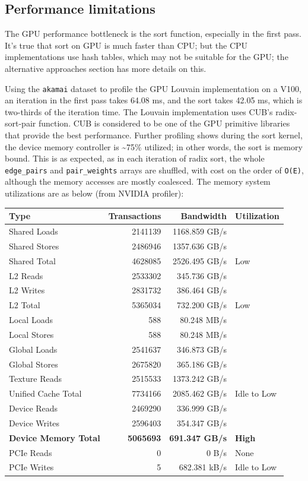 \documentclass[10pt,oneside]{memoir}
\begin{document}
\hypertarget{performance-limitations-4}{%
\subsection{Performance limitations}\label{performance-limitations-4}}

The GPU performance bottleneck is the sort function, especially in the
first pass. It's true that sort on GPU is much faster than CPU; but the
CPU implementations use hash tables, which may not be suitable for the
GPU; the alternative approaches section has more details on this.

Using the \texttt{akamai} dataset to profile the GPU Louvain
implementation on a V100, an iteration in the first pass takes 64.08 ms,
and the sort takes 42.05 ms, which is two-thirds of the iteration time.
The Louvain implementation uses CUB's radix-sort-pair function. CUB is
considered to be one of the GPU primitive libraries that provide the
best performance. Further profiling shows during the sort kernel, the
device memory controller is \textasciitilde{}75\% utilized; in other
words, the sort is memory bound. This is as expected, as in each
iteration of radix sort, the whole \texttt{edge\_pairs} and
\texttt{pair\_weights} arrays are shuffled, with cost on the order of
\texttt{O(\textbar{}E\textbar{})}, although the memory accesses are
mostly coalesced. The memory system utilizations are as below (from
NVIDIA profiler):

\begin{longtable}[]{@{}lrrl@{}}
\toprule
Type & Transactions & Bandwidth & Utilization\tabularnewline
\midrule
\endhead
Shared Loads & 2141139 & 1168.859 GB/s &\tabularnewline
Shared Stores & 2486946 & 1357.636 GB/s &\tabularnewline
Shared Total & 4628085 & 2526.495 GB/s & Low\tabularnewline
L2 Reads & 2533302 & 345.736 GB/s &\tabularnewline
L2 Writes & 2831732 & 386.464 GB/s &\tabularnewline
L2 Total & 5365034 & 732.200 GB/s & Low\tabularnewline
Local Loads & 588 & 80.248 MB/s &\tabularnewline
Local Stores & 588 & 80.248 MB/s &\tabularnewline
Global Loads & 2541637 & 346.873 GB/s &\tabularnewline
Global Stores & 2675820 & 365.186 GB/s &\tabularnewline
Texture Reads & 2515533 & 1373.242 GB/s &\tabularnewline
Unified Cache Total & 7734166 & 2085.462 GB/s & Idle to
Low\tabularnewline
Device Reads & 2469290 & 336.999 GB/s &\tabularnewline
Device Writes & 2596403 & 354.347 GB/s &\tabularnewline
\textbf{Device Memory Total} & \textbf{5065693} & \textbf{691.347 GB/s}
& \textbf{High}\tabularnewline
PCIe Reads & 0 & 0 B/s & None\tabularnewline
PCIe Writes & 5 & 682.381 kB/s & Idle to Low\tabularnewline
\bottomrule
\end{longtable}
\end{document}
